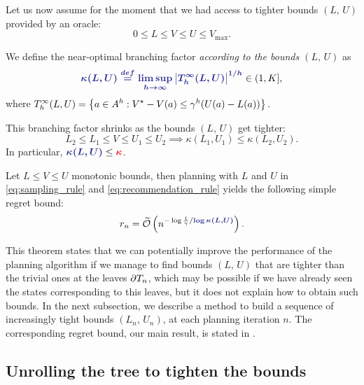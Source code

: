 \documentclass[runningheads]{llncs}
\begin{document}
Let us now assume for the moment that we had access to tighter bounds $(L,\,U)$ provided by an oracle: $$0\leq L\leq V\leq U\leq V_{\max}.$$
\vspace*{-0.5cm}
\begin{definition}
We define the near-optimal branching factor \emph{according to the bounds $(L,\,U)$} as 
\begin{equation}
\hlbb{\kappa(L,U) \eqdef \limsup_{h\rightarrow\infty} \left|\Tau_h^\infty(L,U)\right|^{1/h}}\in(1, K], 
\end{equation}
where
$ \displaystyle
     {T_h^\infty(L,U)}=\left\{a\in A^h: V^\star - V(a)\leq \gamma^{h}(U(a)-L(a))\right\}.
$
\end{definition}

\begin{lemma}
\label{lem:shrink}
This branching factor shrinks as the bounds $(L,\,U)$ get tighter:
\[L_2\leq L_1\leq V\leq U_1\leq U_2\implies \kappa(L_1,U_1) \leq \kappa(L_2,U_2).\]
In particular, $\hlbb{\kappa(L,U)} \leq \hlrb{\kappa}$.
\end{lemma}

\begin{theorem}
\label{thm:regret-bound-U}
Let $L \leq V\leq U$ monotonic bounds, then planning with $L$ and $U$ in \eqref{eq:sampling_rule} and \eqref{eq:recommendation_rule} yields the following simple regret bound:
\begin{equation*}
r_n = \tilde{\cO}\left(n^{-\log \frac{1}{\gamma}/\hlbb{\log \kappa(L,U)}}\right).
\end{equation*}
\end{theorem}


This theorem states that we can potentially improve the performance of the planning algorithm if we manage to find bounds $(L,\, U)$ that are tighter than the trivial ones at the leaves ${\partial T_n}$, which may be possible if we have already seen the states corresponding to this leaves, but it does not explain how to obtain such bounds. In the next subsection, we describe a method to build a sequence of increasingly tight bounds $(L_n,\, U_n)$, at each planning iteration $n$. The corresponding regret bound, our main result, is stated in .


\subsection{Unrolling the tree to tighten the bounds}
\label{sec:unrolling}
\end{document}
